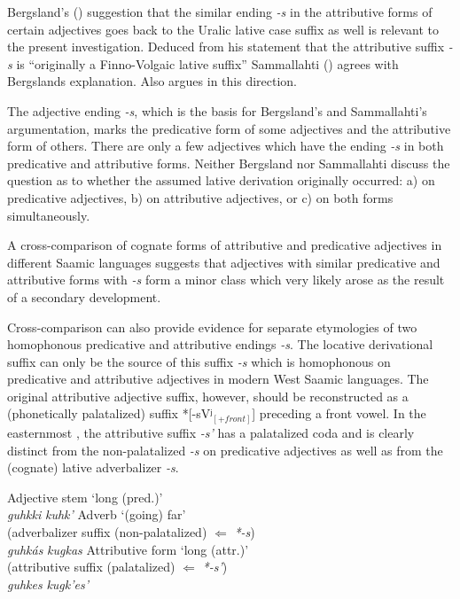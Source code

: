 {Bergsland's (\citeyear[96]{bergsland1946}) suggestion that the similar ending \textit{-s} in the attributive forms of certain adjectives goes back to the Uralic lative case suffix as well is relevant to the present investigation. Deduced from his statement that the attributive suffix \textit{-s} is “originally a Finno-Volgaic lative suffix” Sammallahti (\citeyear[71]{sammallahti1998b}) agrees with Bergslands explanation. Also \cite{judakin1997} argues in this direction.

The adjective ending \textit{-s}, which is the basis for Bergsland's and Sammallahti's argumentation, marks the predicative form of some adjectives and the attributive form of others. There are only a few adjectives which have the ending \textit{-s} in both predicative and attributive forms. Neither Bergsland nor Sammallahti discuss the question as to whether the assumed lative derivation originally occurred: a) on predicative adjectives, b) on attributive adjectives, or c) on both forms simultaneously.
 
A cross-comparison of cognate forms of attributive and predicative adjectives in different Saamic languages suggests that adjectives with similar predicative and attributive forms with \textit{-s} form a minor class which very likely arose as the result of a secondary development.

Cross-comparison can also provide evidence for separate etymologies of two homophonous predicative and attributive endings \textit{-s}. The locative derivational suffix can only be the source of this suffix \textit{-s} which is homophonous on predicative and attributive adjectives in modern West Saamic languages. The original attributive adjective suffix, however, should be reconstructed as a (phonetically palatalized) suffix *[-sVʲ$_{[+front]}$] preceding a front vowel. In the easternmost , the attributive suffix \textit{-s'} has a palatalized coda and is clearly distinct from the non-palatalized \textit{-s} on predicative adjectives as well as from the (cognate) lative adverbalizer \textit{-s}.
\begin{exe}
\settowidth{}
\ex 
\begin{xlist}
\ex	\rm{Adjective stem ‘long (pred.)’}\\
	\textit{guhkki}	
	\textit{kuhk'}	
\ex 	\rm{Adverb ‘(going) far’}\\
	\rm{(adverbalizer suffix (non-palatalized) $\Leftarrow$ \textit{*-s})}\\
	\textit{guhkás}	
	\textit{kugkas}	
\ex 	\rm{Attributive form ‘long (attr.)’}\\
	\rm{(attributive suffix (palatalized) $\Leftarrow$ \textit{*-s'})}\\
	\textit{guhkes}	
	\textit{kugk'es'}	
\end{xlist} 	
\end{exe}

}
